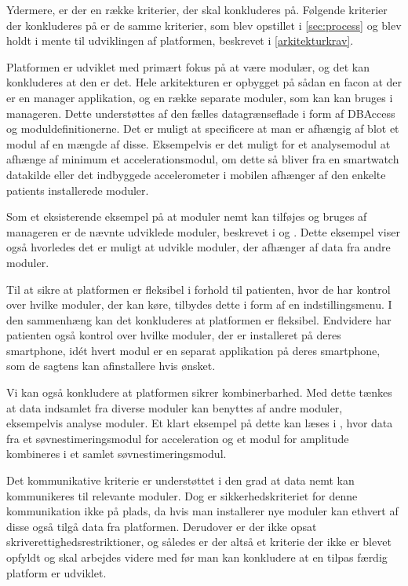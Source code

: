Ydermere, er der en række kriterier, der skal konkluderes på.
Følgende kriterier der konkluderes på er de samme kriterier, som blev opstillet i \cref{sec:process} og blev holdt i mente til udviklingen af platformen, beskrevet i \cref{arkitekturkrav}.
\begin{description}[style=nextline]
	\item[Modulær]
	Platformen er udviklet med primært fokus på at være modulær, og det kan konkluderes at den er det.
	Hele arkitekturen er opbygget på sådan en facon at der er en manager applikation, og en række separate moduler, som kan kan bruges i manageren.
	Dette understøttes af den fælles datagrænseflade i form af DBAccess og moduldefinitionerne.  
	Det er muligt at specificere at man er afhængig af blot et modul af en mængde af disse.
	Eksempelvis er det muligt for et analysemodul at afhænge af minimum et accelerationsmodul, om dette så bliver fra en smartwatch datakilde eller det indbyggede accelerometer i mobilen afhænger af den enkelte patients installerede moduler.
	
	Som et eksisterende eksempel på at moduler nemt kan tilføjes og bruges af manageren er de nævnte udviklede moduler, beskrevet i \citet{misc:soevnrapp} og \citet{misc:surveyrapp}.
	Dette eksempel viser også hvorledes det er muligt at udvikle moduler, der afhænger af data fra andre moduler.
	
	\item[Fleksibilitet]
	Til at sikre at platformen er fleksibel i forhold til patienten, hvor de har kontrol over hvilke moduler, der kan køre, tilbydes dette i form af en indstillingsmenu.
	I den sammenhæng kan det konkluderes at platformen er fleksibel.
	Endvidere har patienten også kontrol over hvilke moduler, der er installeret på deres smartphone, idét hvert modul er en separat applikation på deres smartphone, som de sagtens kan afinstallere hvis ønsket.
	
	\item[Kombinerbar]
	Vi kan også konkludere at platformen sikrer kombinerbarhed.
	Med dette tænkes at data indsamlet fra diverse moduler kan benyttes af andre moduler, eksempelvis analyse moduler.
	Et klart eksempel på dette kan læses i \citet{misc:soevnrapp}, hvor data fra et søvnestimeringsmodul for acceleration og et modul for amplitude kombineres i et samlet søvnestimeringsmodul.
	
	\item[Kommunikativ]
	Det kommunikative kriterie er understøttet i den grad at data nemt kan kommunikeres til relevante moduler.
	Dog er sikkerhedskriteriet for denne kommunikation ikke på plads, da hvis man installerer nye moduler kan ethvert af disse også tilgå data fra platformen.
	Derudover er der ikke opsat skriverettighedsrestriktioner, og således er der altså et kriterie der ikke er blevet opfyldt og skal arbejdes videre med før man kan konkludere at en tilpas færdig platform er udviklet.
\end{description}


